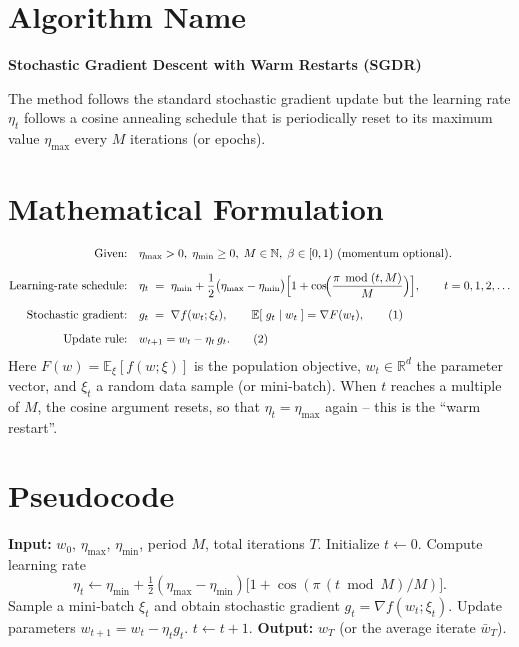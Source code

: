 \documentclass{article}
\newcommand{\EE}{\mathbb{E}}
\newcommand{\RR}{\mathbb{R}}
\begin{document}
\section*{Algorithm Name}
\textbf{Stochastic Gradient Descent with Warm Restarts (SGDR)}  

The method follows the standard stochastic gradient update but the learning rate
$\eta_t$ follows a cosine annealing schedule that is periodically reset to its
maximum value $\eta_{\max }$ every $M$ iterations (or epochs).  

\section*{Mathematical Formulation}
\begin{align}
\text{Given:}&\quad \eta_{\max}>0,\;\eta_{\min}\ge 0,\;M\in\mathbb{N},\;
\beta\in[0,1) \text{ (momentum optional)}. \nonumber\\[2mm]
\text{Learning‑rate schedule:}&\quad 
\eta_t \;=\; \eta_{\min}+ \frac{1}{2}
\bigl(\eta_{\max}-\eta_{\min}\bigr)
\Bigl[1+\cos\!\Bigl(\frac{\pi\,\bmod(t,M)}{M}\Bigr)\Bigr],\qquad t=0,1,2,\dots \label{eq:lr}\\[2mm]
\text{Stochastic gradient:}&\quad 
g_t \;=\; \nabla f(w_t; \xi_t),\qquad 
\EE[\;g_t\mid w_t\;]=\nabla F(w_t),\tag{1}\\[2mm]
\text{Update rule:}&\quad 
w_{t+1}= w_t-\eta_t\,g_t .\tag{2}
\end{align}
Here $F(w)=\EE_{\xi}[f(w;\xi)]$ is the population objective, $w_t\in\RR^d$ the
parameter vector, and $\xi_t$ a random data sample (or mini‑batch).  
When $t$ reaches a multiple of $M$, the cosine argument resets, so that
$\eta_t=\eta_{\max}$ again – this is the “warm restart”.

\section*{Pseudocode}
\begin{algorithm}[H]
\caption{SGDR}
\begin{algorithmic}[1]
\State \textbf{Input:} $w_0$, $\eta_{\max}$, $\eta_{\min}$, period $M$, total iterations $T$.
\State Initialize $t\gets 0$.
    \State Compute learning rate 
    \[
    \eta_t\gets \eta_{\min}+ \tfrac12(\eta_{\max}-\eta_{\min})
    \bigl[1+\cos(\pi\,(t\bmod M)/M)\bigr].
    \] 
    \State Sample a mini‑batch $\xi_t$ and obtain stochastic gradient 
    $g_t=\nabla f(w_t;\xi_t)$.
    \State Update parameters $w_{t+1}=w_t-\eta_t g_t$.
    \State $t\gets t+1$.
\EndWhile
\State \textbf{Output:} $w_T$ (or the average iterate $\bar w_T$).
\end{algorithmic}
\end{algorithm}
\end{document}
